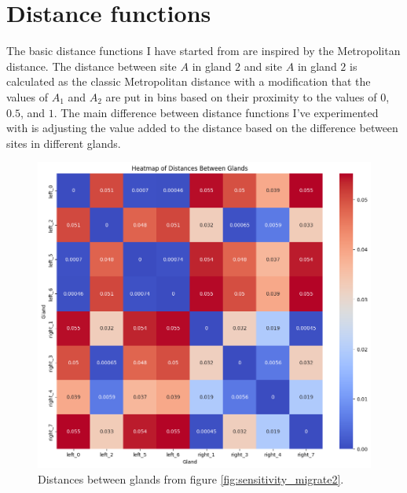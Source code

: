 \section{Distance functions}
The basic distance functions I have started from are inspired by the Metropolitan distance. The distance between site $A$ in gland $2$ and site $A$ in gland $2$ is calculated as the classic Metropolitan distance with a modification that the values of $A_1$ and $A_2$ are put in bins based on their proximity to the values of $0$, $0.5$, and $1$. The main difference between distance functions I've experimented with is adjusting the value added to the distance based on the difference between sites in different glands.
\begin{figure}[h]
    \centering
    \includegraphics[width=\textwidth]{Chapter_5/figures/sensitivity_migrate2_distances.png}
    \caption{Distances between glands from figure \ref{fig:sensitivity_migrate2}.}
    \label{fig:distance_functions}
\end{figure}
